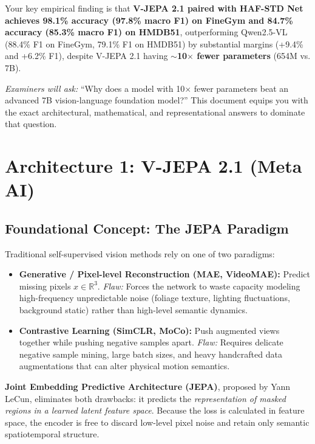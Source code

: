 \documentclass[a4paper, 11pt]{article}
\begin{document}
\begin{tipbox}
Your key empirical finding is that \textbf{V-JEPA 2.1 paired with HAF-STD Net achieves 98.1\% accuracy (97.8\% macro F1) on FineGym and 84.7\% accuracy (85.3\% macro F1) on HMDB51}, outperforming Qwen2.5-VL (88.4\% F1 on FineGym, 79.1\% F1 on HMDB51) by substantial margins (+9.4\% and +6.2\% F1), despite V-JEPA 2.1 having \textbf{$\sim$10$\times$ fewer parameters} (654M vs. 7B).

\emph{Examiners will ask:} ``Why does a model with 10$\times$ fewer parameters beat an advanced 7B vision-language foundation model?'' This document equips you with the exact architectural, mathematical, and representational answers to dominate that question.
\end{tipbox}

\vspace{0.3cm}

\section{Architecture 1: V-JEPA 2.1 (Meta AI)}

\subsection{Foundational Concept: The JEPA Paradigm}
Traditional self-supervised vision methods rely on one of two paradigms:
\begin{itemize}
    \item \textbf{Generative / Pixel-level Reconstruction (MAE, VideoMAE):} Predict missing pixels $x \in \mathbb{R}^3$. \emph{Flaw:} Forces the network to waste capacity modeling high-frequency unpredictable noise (foliage texture, lighting fluctuations, background static) rather than high-level semantic dynamics.
    \item \textbf{Contrastive Learning (SimCLR, MoCo):} Push augmented views together while pushing negative samples apart. \emph{Flaw:} Requires delicate negative sample mining, large batch sizes, and heavy handcrafted data augmentations that can alter physical motion semantics.
\end{itemize}

\textbf{Joint Embedding Predictive Architecture (JEPA)}, proposed by Yann LeCun, eliminates both drawbacks: it predicts the \emph{representation of masked regions in a learned latent feature space}. Because the loss is calculated in feature space, the encoder is free to discard low-level pixel noise and retain only semantic spatiotemporal structure.
\end{document}
